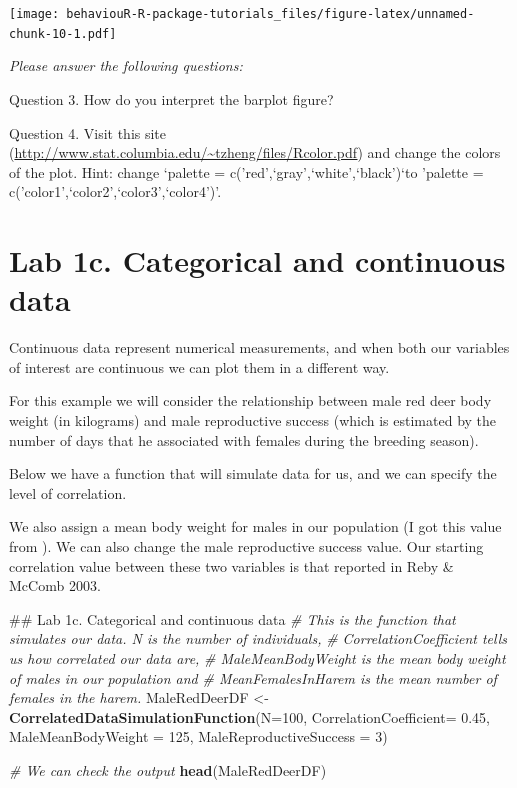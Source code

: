 \documentclass[]{book}
\newenvironment{Shaded}{\begin{snugshade}}{\end{snugshade}}
\newcommand{\CommentTok}[1]{\textcolor[rgb]{0.56,0.35,0.01}{\textit{#1}}}
\newcommand{\DataTypeTok}[1]{\textcolor[rgb]{0.13,0.29,0.53}{#1}}
\newcommand{\DecValTok}[1]{\textcolor[rgb]{0.00,0.00,0.81}{#1}}
\newcommand{\FloatTok}[1]{\textcolor[rgb]{0.00,0.00,0.81}{#1}}
\newcommand{\KeywordTok}[1]{\textcolor[rgb]{0.13,0.29,0.53}{\textbf{#1}}}
\newcommand{\NormalTok}[1]{#1}
\newcommand{\StringTok}[1]{\textcolor[rgb]{0.31,0.60,0.02}{#1}}
\begin{document}
\texttt{[image: behaviouR-R-package-tutorials\_files/figure-latex/unnamed-chunk-10-1.pdf]}

\emph{Please answer the following questions:}

Question 3. How do you interpret the barplot figure?

Question 4. Visit this site (\url{http://www.stat.columbia.edu/~tzheng/files/Rcolor.pdf}) and change the colors of the plot. Hint: change `palette = c('red',`gray',`white',`black')`to 'palette = c('color1',`color2',`color3',`color4')'.

\hypertarget{lab-1c.-categorical-and-continuous-data}{%
\section*{Lab 1c. Categorical and continuous data}\label{lab-1c.-categorical-and-continuous-data}}

Continuous data represent numerical measurements, and when both our variables of interest are continuous we can plot them in a different way.

For this example we will consider the relationship between male red deer body weight (in kilograms) and male reproductive success (which is estimated by the number of days that he associated with females during the breeding season).

Below we have a function that will simulate data for us, and we can specify the level of correlation.

We also assign a mean body weight for males in our population (I got this value from ). We can also change the male reproductive success value. Our starting correlation value between these two variables is that reported in Reby \& McComb 2003.

\begin{Shaded}
\begin{Highlighting}[]
\NormalTok{## Lab 1c. Categorical and continuous data}
\CommentTok{# This is the function that simulates our data. N is the number of individuals,   }
\CommentTok{# CorrelationCoefficient tells us how correlated our data are,  }
\CommentTok{# MaleMeanBodyWeight is the mean body weight of males in our population and }
\CommentTok{# MeanFemalesInHarem is the mean number of females in the harem.}
\NormalTok{MaleRedDeerDF <-}\StringTok{ }\KeywordTok{CorrelatedDataSimulationFunction}\NormalTok{(}\DataTypeTok{N=}\DecValTok{100}\NormalTok{, }
                                                  \DataTypeTok{CorrelationCoefficient=} \FloatTok{0.45}\NormalTok{,}
                                                  \DataTypeTok{MaleMeanBodyWeight =} \DecValTok{125}\NormalTok{,}
                                                  \DataTypeTok{MaleReproductiveSuccess =} \DecValTok{3}\NormalTok{)}

\CommentTok{# We can check the output}
\KeywordTok{head}\NormalTok{(MaleRedDeerDF)}
\end{Highlighting}
\end{Shaded}
\end{document}
